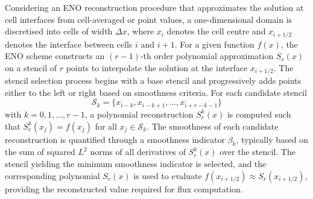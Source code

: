 

Considering an ENO reconstruction procedure that approximates the solution at cell interfaces from cell-averaged or point values, a one-dimensional domain is discretised into cells of width $\Delta x$, where $x_i$ denotes the cell centre and $x_{i+1/2}$ denotes the interface between cells $i$ and $i+1$. For a given function $f(x)$, the ENO scheme constructs an $(r-1)$-th order polynomial approximation $S_r(x)$ on a stencil of $r$ points to interpolate the solution at the interface $x_{i+1/2}$. The stencil selection process begins with a base stencil and progressively adds points either to the left or right based on smoothness criteria. For each candidate stencil 
\begin{equation}
\mathcal{S}_k = \{x_{i-k}, x_{i-k+1}, \ldots, x_{i+r-k-1}\}
\end{equation}
with $k = 0, 1, \ldots, r-1$, a polynomial reconstruction $S_r^k(x)$ is computed such that $S_r^k(x_j) = f(x_j)$ for all $x_j \in \mathcal{S}_k$. The smoothness of each candidate reconstruction is quantified through a smoothness indicator $\beta_k$, typically based on the sum of squared $L^2$ norms of all derivatives of $S_r^k(x)$ over the stencil. The stencil yielding the minimum smoothness indicator is selected, and the corresponding polynomial $S_r(x)$ is used to evaluate $f(x_{i+1/2}) \approx S_r(x_{i+1/2})$, providing the reconstructed value required for flux computation. 

